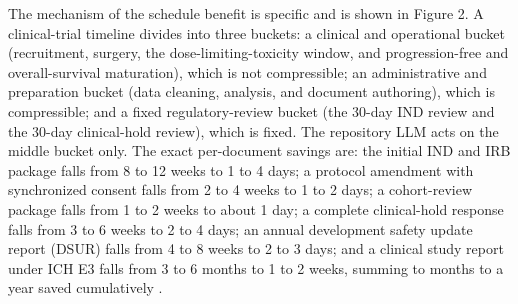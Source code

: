 The mechanism of the schedule benefit is specific and is shown in Figure 2. A
clinical-trial timeline divides into three buckets: a clinical and operational
bucket (recruitment, surgery, the dose-limiting-toxicity window, and
progression-free and overall-survival maturation), which is not compressible; an
administrative and preparation bucket (data cleaning, analysis, and document
authoring), which is compressible; and a fixed regulatory-review bucket (the 30-day
IND review and the 30-day clinical-hold review), which is fixed. The repository LLM
acts on the middle bucket only. The exact per-document savings are: the initial IND
and IRB package falls from 8 to 12 weeks to 1 to 4 days; a protocol amendment with
synchronized consent falls from 2 to 4 weeks to 1 to 2 days; a cohort-review package
falls from 1 to 2 weeks to about 1 day; a complete clinical-hold response falls from
3 to 6 weeks to 2 to 4 days; an annual development safety update report (DSUR) falls
from 4 to 8 weeks to 2 to 3 days; and a clinical study report under ICH E3 falls
from 3 to 6 months to 1 to 2 weeks, summing to months to a year saved cumulatively
\cite{paipredict4x,paisitedocpk}.

